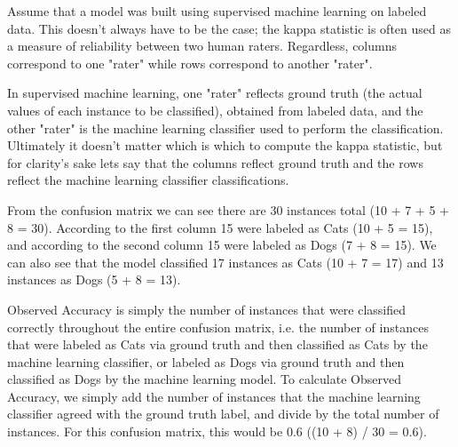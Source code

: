 \documentclass[caret-main.tex]{subfiles}
\begin{document}
\item Assume that a model was built using supervised machine learning on labeled data. This doesn't always have to be the case; the kappa statistic is often used as a measure of reliability between two human raters. Regardless, columns correspond to one "rater" while rows correspond to another "rater". 

\item In supervised machine learning, one "rater" reflects ground truth (the actual values of each instance to be classified), obtained from labeled data, and the other "rater" is the machine learning classifier used to perform the classification. Ultimately it doesn't matter which is which to compute the kappa statistic, but for clarity's sake lets say that the columns reflect ground truth and the rows reflect the machine learning classifier classifications.

\item From the confusion matrix we can see there are 30 instances total (10 + 7 + 5 + 8 = 30). According to the first column 15 were labeled as Cats (10 + 5 = 15), and according to the second column 15 were labeled as Dogs (7 + 8 = 15). We can also see that the model classified 17 instances as Cats (10 + 7 = 17) and 13 instances as Dogs (5 + 8 = 13).

\item Observed Accuracy is simply the number of instances that were classified correctly throughout the entire confusion matrix, i.e. the number of instances that were labeled as Cats via ground truth and then classified as Cats by the machine learning classifier, or labeled as Dogs via ground truth and then classified as Dogs by the machine learning model. To calculate Observed Accuracy, we simply add the number of instances that the machine learning classifier agreed with the ground truth label, and divide by the total number of instances. For this confusion matrix, this would be 0.6 ((10 + 8) / 30 = 0.6).
\end{document}
